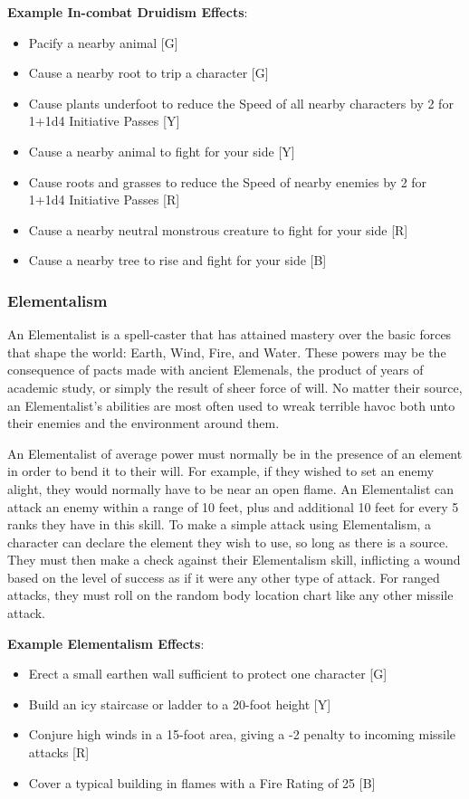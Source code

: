 \documentclass[oneside]{book}
\begin{document}
\begin{multicols}{2}
\textbf{Example In-combat Druidism Effects}: 
	\begin{itemize}
		\setlength{\itemsep}{0cm}%
  		\setlength{\parskip}{0cm}%
		\item{ \small Pacify a nearby animal [G]}
		\item{ \small Cause a nearby root to trip a character [G]}
		\item{ \small Cause plants underfoot to reduce the Speed of all nearby characters by 2 for 1+1d4 Initiative Passes [Y]}
		\item{ \small Cause a nearby animal to fight for your side [Y]}
		\item{ \small Cause roots and grasses to reduce the Speed of nearby enemies by 2 for 1+1d4 Initiative Passes [R]}
		\item{ \small Cause a nearby neutral monstrous creature to fight for your side [R]}
		\item{ \small Cause a nearby tree to rise and fight for your side [B]}
	\end{itemize}

\subsubsection{Elementalism}
An Elementalist is a spell-caster that has attained mastery over the basic forces that shape the world: Earth, Wind, Fire, and Water. These powers may be the consequence of pacts made with ancient Elemenals, the product of years of academic study, or simply the result of sheer force of will. No matter their source, an Elementalist's abilities are most often used to wreak terrible havoc both unto their enemies and the environment around them. 

An Elementalist of average power must normally be in the presence of an element in order to bend it to their will. For example, if they wished to set an enemy alight, they would normally have to be near an open flame. An Elementalist can attack an enemy within a range of 10 feet, plus and additional 10 feet for every 5 ranks they have in this skill. To make a simple attack using Elementalism, a character can declare the element they wish to use, so long as there is a source. They must then make a check against their Elementalism skill, inflicting a wound based on the level of success as if it were any other type of attack. For ranged attacks, they must roll on the  random body location chart like any other missile attack.

\textbf{Example Elementalism Effects}:
	\begin{itemize}
		\setlength{\itemsep}{0cm}%
  		\setlength{\parskip}{0cm}%
		\item{ \small Erect a small earthen wall sufficient to protect one character [G]}
		\item{ \small Build an icy staircase or ladder to a 20-foot height [Y]}
		\item{ \small Conjure high winds in a 15-foot area, giving a -2 penalty to incoming missile attacks [R]}
		\item{ \small Cover a typical building in flames with a Fire Rating of 25  [B]}
	\end{itemize}


\end{multicols}
\end{document}
